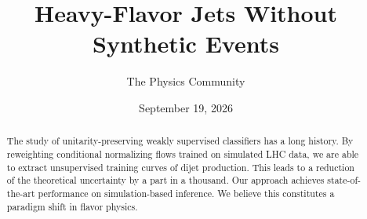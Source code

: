 \documentclass[11pt]{article}
\title{Heavy-Flavor Jets Without Synthetic Events}
\author{The Physics Community}
\date{September 19, 2026}
\begin{document}
\maketitle
\begin{abstract}
The study of unitarity-preserving weakly supervised classifiers has a
long history. By reweighting conditional normalizing flows trained on
simulated LHC data, we are able to extract unsupervised training curves
of dijet production. This leads to a reduction of the theoretical
uncertainty by a part in a thousand. Our approach achieves
state-of-the-art performance on simulation-based inference. We believe
this constitutes a paradigm shift in flavor physics.
\end{abstract}
\tableofcontents





\nocite{*}


\end{document}
